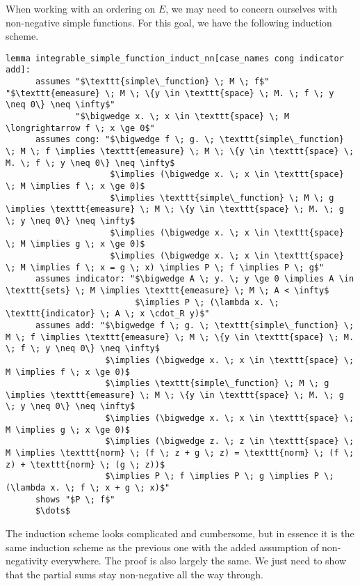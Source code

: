 When working with an ordering on $E$, we may need to concern ourselves with non-negative simple functions. For this goal, we have the following induction scheme.

\begin{isalemma}
{\small
	\begin{lstlisting}[style=isabelle]
	lemma integrable_simple_function_induct_nn[case_names cong indicator add]:
	  assumes "$\texttt{simple\_function} \; M \; f$" "$\texttt{emeasure} \; M \; \{y \in \texttt{space} \; M. \; f \; y \neq 0\} \neq \infty$" 
			  "$\bigwedge x. \; x \in \texttt{space} \; M \longrightarrow f \; x \ge 0$"
	  assumes cong: "$\bigwedge f \; g. \; \texttt{simple\_function} \; M \; f \implies \texttt{emeasure} \; M \; \{y \in \texttt{space} \; M. \; f \; y \neq 0\} \neq \infty$ 
					 $\implies (\bigwedge x. \; x \in \texttt{space} \; M \implies f \; x \ge 0)$
					 $\implies \texttt{simple\_function} \; M \; g \implies \texttt{emeasure} \; M \; \{y \in \texttt{space} \; M. \; g \; y \neq 0\} \neq \infty$
					 $\implies (\bigwedge x. \; x \in \texttt{space} \; M \implies g \; x \ge 0)$
					 $\implies (\bigwedge x. \; x \in \texttt{space} \; M \implies f \; x = g \; x) \implies P \; f \implies P \; g$"
	  assumes indicator: "$\bigwedge A \; y. \; y \ge 0 \implies A \in \texttt{sets} \; M \implies \texttt{emeasure} \; M \; A < \infty$
						  $\implies P \; (\lambda x. \; \texttt{indicator} \; A \; x \cdot_R y)$"
	  assumes add: "$\bigwedge f \; g. \; \texttt{simple\_function} \; M \; f \implies \texttt{emeasure} \; M \; \{y \in \texttt{space} \; M. \; f \; y \neq 0\} \neq \infty$
					$\implies (\bigwedge x. \; x \in \texttt{space} \; M \implies f \; x \ge 0)$
					$\implies \texttt{simple\_function} \; M \; g \implies \texttt{emeasure} \; M \; \{y \in \texttt{space} \; M. \; g \; y \neq 0\} \neq \infty$
					$\implies (\bigwedge x. \; x \in \texttt{space} \; M \implies g \; x \ge 0)$
					$\implies (\bigwedge z. \; z \in \texttt{space} \; M \implies \texttt{norm} \; (f \; z + g \; z) = \texttt{norm} \; (f \; z) + \texttt{norm} \; (g \; z))$
					$\implies P \; f \implies P \; g \implies P \; (\lambda x. \; f \; x + g \; x)$"
	  shows "$P \; f$"
	  $\dots$
	\end{lstlisting}
}
\end{isalemma}

The induction scheme looks complicated and cumbersome, but in essence it is the same induction scheme as the previous one with the added assumption of non-negativity everywhere. The proof is also largely the same. We just need to show that the partial sums stay non-negative all the way through.

